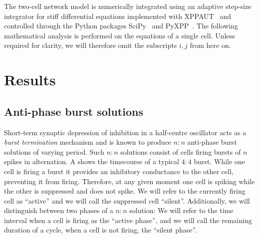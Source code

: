 \documentclass[utf8]{frontiersFPHY} %
\begin{document}
The two-cell network model is numerically integrated using an adaptive step-size integrator for stiff differential equations implemented with XPPAUT~\citep{ermentrout2002} and controlled through the Python packages SciPy~\citep{scipy2020} and PyXPP~\citep{pyxpp}.
The following mathematical analysis is performed on the equations of a single cell.
Unless required for clarity, we will therefore omit the subscripts $i,j$ from here on.

\section{Results}
\subsection{Anti-phase burst solutions}
Short-term synaptic depression of inhibition in a half-centre oscillator acts as a \emph{burst termination} mechanism \citep{brown1911} and is known to produce $n:n$ anti-phase burst solutions of varying period.
Such $n:n$ solutions consist of cells firing bursts of $n$ spikes in alternation.
A shows the timecourse of a typical $4:4$ burst.
While one cell is firing a burst it provides an inhibitory conductance to the other cell,  preventing it from firing.
Therefore, at any given moment one cell is spiking while the other is suppressed and does not spike.
We will refer to the currently firing cell as ``active'' and we will call the suppressed cell ``silent''.
Additionally, we will distinguish between two phases of a $n:n$ solution:
We will refer to the time interval when a cell is firing as the ``active phase'', and we will call the remaining duration of a cycle, when a cell is not firing, the ``silent  phase''.
\end{document}
